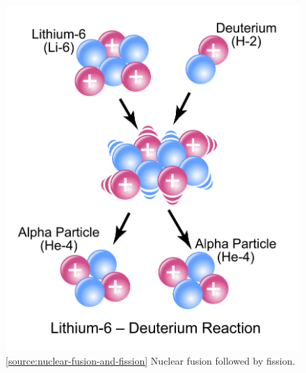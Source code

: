 \documentclass[oneside]{book}
\begin{document}
\begin{minipage}{0.5\textwidth}
    \begin{figure}[H]
        \centering
        \includegraphics[width=\textwidth]{../images/Li6-D_Reaction.pdf}
        \caption{\ref{source:nuclear-fusion-and-fission} Nuclear fusion followed by fission.}
        \label{fig:nuclear-fusion-and-fission}
    \end{figure} 
\end{minipage}%
\end{document}
